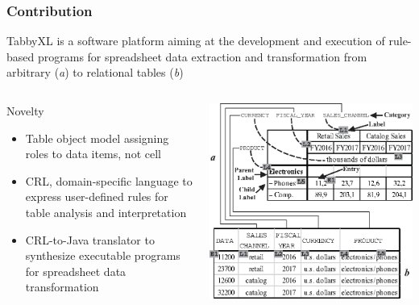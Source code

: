 \documentclass[10pt]{beamer}
\begin{document}



\begin{frame}
\frametitle{Contribution}
\small TabbyXL is a software platform aiming at the development and execution of rule-based programs for spreadsheet data extraction and transformation from arbitrary (\textit{a}) to relational tables (\textit{b})
\begin{columns}[c] %
\begin{block}{\small Novelty}
\begin{itemize}
\item \small Table object model assigning roles to data items, not cell
\item \small CRL, domain-specific language to express user-defined rules for table analysis and interpretation
\item \small CRL-to-Java translator to synthesize executable programs for spreadsheet data transformation
\end{itemize}
\end{block}
\includegraphics[width=0.85\linewidth]{intro}
\end{columns}
\end{frame}
\end{document}
